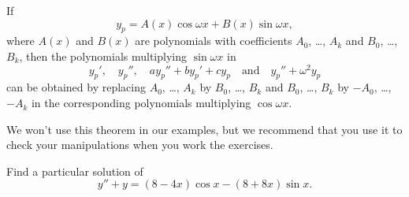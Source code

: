 \begin{theorem}\label{thmtype:5.5.2}
If
\[
y_p=A(x)\cos\omega x+B(x)\sin\omega x,
\]
where $A(x)$ and $B(x)$ are polynomials with coefficients
$A_0$, \dots, $A_k$ and $B_0$, \dots, $B_k$, then the polynomials
multiplying $\sin\omega x$ in
\[
y_p',\quad y_p'',\quad  ay_p''+by_p'+cy_p
\quad\text{and}\quad  y_p''+\omega^2 y_p
\]
can be obtained by replacing $A_0$, \dots, $A_k$ by $B_0$, \dots, $B_k$
and $B_0$, \dots,  $B_k$ by $-A_0$, \dots, $-A_k$ in the corresponding
polynomials multiplying $\cos\omega x$.
\end{theorem}

We won't use this theorem in our examples, but we recommend that
you use it to check your manipulations when you work the  exercises.



\begin{example}\label{example:5.5.4}
Find a particular solution of
\begin{equation} \label{eq:5.5.12}
y''+y=(8-4x)\cos x-(8+8x)\sin x.
\end{equation}
\end{example}

